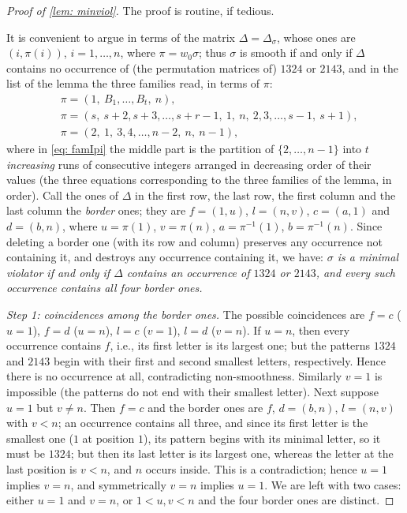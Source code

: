 \documentclass[10pt,a4paper]{amsart}
\newcommand{\IM}{\Delta}
\begin{document}
\begin{proof}[Proof of \cref{lem: minviol}]
The proof is routine, if tedious.

It is convenient to argue in terms of the matrix $\IM=\IM_\sigma$, whose ones are $(i,\pi(i))$, $i=1,\dots,n$,
where $\pi=w_0\sigma$; thus $\sigma$ is smooth if and only if $\IM$ contains no occurrence of (the permutation
matrices of) $1324$ or $2143$, and in the list of the lemma the three families read, in terms of $\pi$:
\begin{align}
&\pi=(1,\ B_1,\dots,B_t,\ n),\label{eq: famIpi}\\
&\pi=(s,\ s+2,s+3,\dots,s+r-1,\ 1,\ n,\ 2,3,\dots,s-1,\ s+1),\label{eq: famIIpi}\\
&\pi=(2,\ 1,\ 3,4,\dots,n-2,\ n,\ n-1),\label{eq: famIIIpi}
\end{align}
where in \cref{eq: famIpi} the middle part is the partition of $\{2,\dots,n-1\}$ into $t$ \emph{increasing} runs of
consecutive integers arranged in decreasing order of their values (the three equations corresponding to the three
families of the lemma, in order).
Call the ones of $\IM$ in the first row, the last row, the first column and the last column the \emph{border} ones;
they are $f=(1,u)$, $l=(n,v)$, $c=(a,1)$ and $d=(b,n)$, where $u=\pi(1)$, $v=\pi(n)$, $a=\pi^{-1}(1)$, $b=\pi^{-1}(n)$.
Since deleting a border one (with its row and column) preserves any occurrence not containing it, and destroys any
occurrence containing it, we have:
\emph{$\sigma$ is a minimal violator if and only if $\IM$ contains an occurrence of $1324$ or $2143$, and every such
occurrence contains all four border ones.}

\emph{Step 1: coincidences among the border ones.}
The possible coincidences are $f=c$ ($u=1$), $f=d$ ($u=n$), $l=c$ ($v=1$), $l=d$ ($v=n$).
If $u=n$, then every occurrence contains $f$, i.e., its first letter is its largest one; but the patterns $1324$ and
$2143$ begin with their first and second smallest letters, respectively. Hence there is no occurrence at all,
contradicting non-smoothness. Similarly $v=1$ is impossible (the patterns do not end with their smallest letter).
Next suppose $u=1$ but $v\ne n$. Then $f=c$ and the border ones are $f$, $d=(b,n)$, $l=(n,v)$ with $v<n$; an
occurrence contains all three, and since its first letter is the smallest one ($1$ at position $1$), its pattern
begins with its minimal letter, so it must be $1324$; but then its last letter is its largest one, whereas the letter
at the last position is $v<n$, and $n$ occurs inside. This is a contradiction; hence $u=1$ implies $v=n$, and
symmetrically $v=n$ implies $u=1$. We are left with two cases: either $u=1$ and $v=n$, or $1<u,v<n$ and the four
border ones are distinct.


\end{proof}
\end{document}
